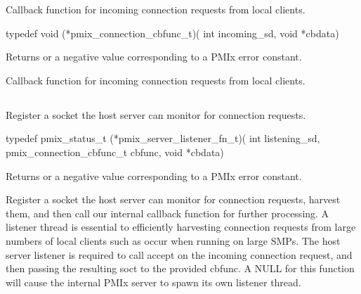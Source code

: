 \summary

Callback function for incoming connection requests from local clients.

\format

\cspecificstart
\begin{codepar}
typedef void (*pmix_connection_cbfunc_t)(
                    int incoming_sd, void *cbdata)
\end{codepar}
\cspecificend

\begin{arglist}
\end{arglist}

Returns  or a negative value corresponding to a PMIx error constant.

\descr

Callback function for incoming connection requests from local clients.


\subsection{}

\summary

Register a socket the host server can monitor for connection requests.

\format

\cspecificstart
\begin{codepar}
typedef pmix_status_t (*pmix_server_listener_fn_t)(
                             int listening_sd,
                             pmix_connection_cbfunc_t cbfunc,
                             void *cbdata)
\end{codepar}
\cspecificend

\begin{arglist}
\end{arglist}

Returns  or a negative value corresponding to a PMIx error constant.

\descr

Register a socket the host server can monitor for connection requests, harvest them, and then call our internal callback function for further processing.
A listener thread is essential to efficiently harvesting connection requests from large numbers of local clients such as occur when running on large SMPs.
The host server listener is required to call accept on the incoming connection request, and then passing the resulting soct to the provided cbfunc.
A NULL for this function will cause the internal PMIx server to spawn its own listener thread.


